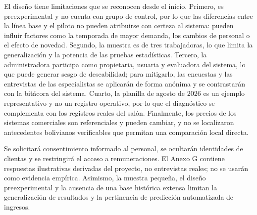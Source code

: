 El diseño tiene limitaciones que se reconocen desde el inicio. Primero, es preexperimental y no cuenta con grupo de control, por lo que las diferencias entre la línea base y el piloto no pueden atribuirse con certeza al sistema: pueden influir factores como la temporada de mayor demanda, los cambios de personal o el efecto de novedad. Segundo, la muestra es de tres trabajadoras, lo que limita la generalización y la potencia de las pruebas estadísticas. Tercero, la administradora participa como propietaria, usuaria y evaluadora del sistema, lo que puede generar sesgo de deseabilidad; para mitigarlo, las encuestas y las entrevistas de las especialistas se aplicarán de forma anónima y se contrastarán con la bitácora del sistema. Cuarto, la planilla de agosto de 2026 es un ejemplo representativo y no un registro operativo, por lo que el diagnóstico se complementa con los registros reales del salón. Finalmente, los precios de los sistemas comerciales son referenciales y pueden cambiar, y no se localizaron antecedentes bolivianos verificables que permitan una comparación local directa.


Se solicitará consentimiento informado al personal, se ocultarán identidades de clientas y se restringirá el acceso a remuneraciones. El Anexo G contiene respuestas ilustrativas derivadas del proyecto, no entrevistas reales; no se usarán como evidencia empírica. Asimismo, la muestra pequeña, el diseño preexperimental y la ausencia de una base histórica extensa limitan la generalización de resultados y la pertinencia de predicción automatizada de ingresos.

